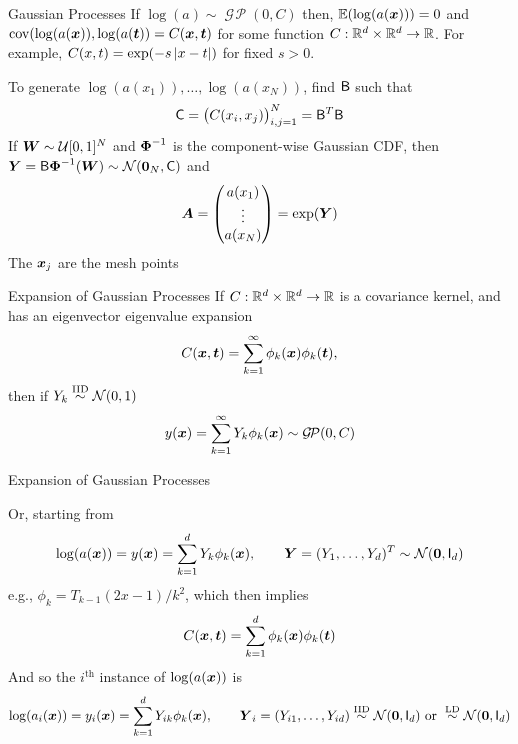 \documentclass[11pt,compress,xcolor={usenames,dvipsnames},aspectratio=169]{beamer}
\DeclareMathOperator{\GP}{\mathcal{G} \! \mathcal{P}}
\begin{document}
\begin{frame}{Gaussian Processes}
    \vspace{-4ex}
If $\log(a) \sim \GP(0,C)$ then, $\operatorname{\mathbb{E}}(\log(a(\boldsymbol{x}))) = 0$ and $\operatorname{cov}(\log(a(\boldsymbol{x})), \log(a(\boldsymbol{t})) = C(\boldsymbol{x},\boldsymbol{t})$ for some function $C:\mathbb{R}^d \times \mathbb{R}^d \to \mathbb{R}$. 
For example, $C(x,t) = \exp(- s \left \lvert x-t \right \rvert)$ for fixed $s>0$.

To generate $\log(a(x_1)), \ldots, \log(a(x_N))$, find $\mathsf{B}$ such that 
\[
\mathsf{C} = \bigl(C(x_i,x_j)\bigr)_{i,j=1}^N = \mathsf{B}^T \mathsf{B}
\]
If $\boldsymbol{W} \sim \mathcal{U}[0,1]^N$ and $\boldsymbol{\Phi}^{-1}$ is the component-wise Gaussian CDF, then $\boldsymbol{Y} = \mathsf{B} \boldsymbol{\Phi}^{-1}(\boldsymbol{W}) \sim \mathcal{N}(\boldsymbol{0}_N,\mathsf{C})$ and 
\[
\boldsymbol{A} = \begin{pmatrix} a(x_1) \\ \vdots \\ a(x_N) \end{pmatrix}
= \exp(\boldsymbol{Y})
\]
The $\boldsymbol{x}_j$ are the mesh points


\end{frame}

\begin{frame}{Expansion of Gaussian Processes}
    \vspace{-8ex}
If $C:\mathbb{R}^d \times \mathbb{R}^d \to \mathbb{R}$ is a covariance kernel, and has an eigenvector eigenvalue expansion
\[
C(\boldsymbol{x},\boldsymbol{t}) = \sum_{k=1}^\infty \phi_k(\boldsymbol{x}) \phi_k(\boldsymbol{t}),
\]
then if $Y_k \overset{\textup{IID}}{\sim} \mathcal{N}(0,1)$
\[
y(\vx) = \sum_{k=1}^\infty Y_k \phi_k(\vx) \sim \GP(0,C)
\]
\end{frame}

\begin{frame}{Expansion of Gaussian Processes}

Or, starting from
\[
\log(a(\boldsymbol{x})) = y(\boldsymbol{x}) = \sum_{k=1}^d Y_k \phi_k(\boldsymbol{x}), \qquad \boldsymbol{Y} = (Y_1, \ldots, Y_d)^T \sim \mathcal{N}(\boldsymbol{0},\mathsf{I}_d)
\]
e.g., $\phi_k = T_{k-1}(2x-1)/k^2$, which then implies
\[
C(\boldsymbol{x},\boldsymbol{t}) = \sum_{k=1}^d \phi_k(\boldsymbol{x}) \phi_k(\boldsymbol{t})
\]
And so the $i^{\text{th}}$ instance of $\log(a(\boldsymbol{x}))$ is
\[
\log(a_i(\boldsymbol{x})) = y_i(\boldsymbol{x}) = \sum_{k=1}^d Y_{ik} \phi_k(\boldsymbol{x}), \qquad \boldsymbol{Y}_i = (Y_{i1}, \ldots, Y_{id}) \overset{\textup{IID}}{\sim} \mathcal{N}(\boldsymbol{0},\mathsf{I}_d) \text{ or } \overset{\textup{LD}}{\sim} \mathcal{N}(\boldsymbol{0},\mathsf{I}_d)
\]

\end{frame}
\end{document}
